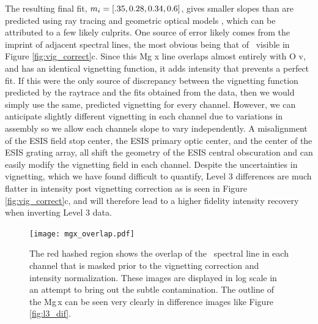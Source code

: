 The resulting final fit, $m_i = [.35, 0.28, 0.34, 0.6]$, gives smaller slopes than are predicted using ray tracing and geometric optical models \citep{ESIS}, which can be attributed to a few likely culprits. 
One source of error likely comes from the imprint of adjacent spectral lines, the most obvious being that of \mgxdim \ visible in Figure \ref{fig:vig_correct}c.
Since this Mg {\sc x} line overlaps almost entirely with O {\sc v}, and has an identical vignetting function, it adds intensity that prevents a perfect fit. 
If this were the only source of discrepancy between the vignetting function predicted by the raytrace and the fits obtained from the data, then we would simply use the same, predicted vignetting for every channel. 
However, we can anticipate slightly different vignetting in each channel due to variations in assembly so we allow each channels slope to vary independently.
A misalignment of the ESIS field stop center, the ESIS primary optic center, and the center of the ESIS grating array, all shift the geometry of the ESIS central obscuration and can easily modify the vignetting field in each channel.
Despite the uncertainties in vignetting, which we have found difficult to quantify, Level 3 differences are much flatter in intensity post vignetting correction as is seen in Figure \ref{fig:vig_correct}c, and will therefore lead to a higher fidelity intensity recovery when inverting Level 3 data.
        
  
        
        \begin{figure}[htb!]
        	\centering
        	\texttt{[image: mgx\_overlap.pdf]}
        	\caption{The red hashed region shows the overlap of the \mgxbright \ spectral line in each channel that is masked prior to the vignetting correction and intensity normalization. These images are displayed in log scale in an attempt to bring out the subtle contamination.  The outline of the Mg\,{\sc x} can be seen very clearly in difference images like Figure \ref{fig:l3_dif}. }

        	\label{fig:mgx_overlap}
        \end{figure}
        
